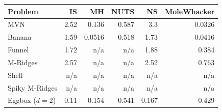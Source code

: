 \begin{tabular}{lrrrrr}
\toprule
Problem & IS & MH & NUTS & NS & MoleWhacker \\
\midrule
MVN & 2.52 & 0.136 & 0.587 & 3.3 & 0.0326 \\
Banana & 1.59 & 0.0516 & 0.518 & 1.73 & 0.0416 \\
Funnel & 1.72 & n/a & n/a & 1.88 & 0.384 \\
M-Ridges & 2.57 & n/a & n/a & 2.52 & 0.763 \\
Shell & n/a & n/a & n/a & n/a & n/a \\
Spiky M-Ridges & n/a & n/a & n/a & n/a & n/a \\
\midrule
Eggbox ($d=2$) & 0.11 & 0.154 & 0.541 & 0.167 & 0.429 \\
\bottomrule
\end{tabular}

